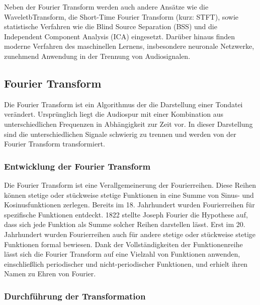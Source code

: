 \par

Neben der Fourier Transform werden auch andere Ansätze wie die WaveletbTransform, die Short-Time Fourier Transform (kurz: STFT), sowie statistische Verfahren wie die Blind Source Separation (BSS) und die Independent Component Analysis (ICA) eingesetzt. Darüber hinaus finden moderne Verfahren des maschinellen Lernens, insbesondere neuronale Netzwerke, zunehmend Anwendung in der Trennung von Audiosignalen.

%
\subsection{Fourier Transform}
%

Die Fourier Transform ist ein Algorithmus der die Darstellung einer Tondatei verändert. Ursprünglich liegt die Audiospur mit einer Kombination aus unterschiedlichen Frequenzen in Abhängigkeit zur Zeit vor. In dieser Darstellung sind die unterschiedlichen Signale schwierig zu trennen und werden von der Fourier Transform transformiert.

\par

%
\subsubsection{Entwicklung der Fourier Transform}
%

Die Fourier Transform ist eine Verallgemeinerung der Fourierreihen. Diese Reihen können stetige oder stückweise stetige Funktionen in eine Summe von Sinus- und Kosinusfunktionen zerlegen. Bereits im 18. Jahrhundert wurden Fourierreihen für spezifische Funktionen entdeckt. 1822 stellte Joseph Fourier die Hypothese auf, dass sich jede Funktion als Summe solcher Reihen darstellen lässt. Erst im 20. Jahrhundert wurden Fourierreihen auch für andere stetige oder stückweise stetige Funktionen formal bewiesen. Dank der Vollständigkeiten der Funktionenreihe lässt sich die Fourier Transform auf eine Vielzahl von Funktionen anwenden, einschließlich periodischer und nicht-periodischer Funktionen, und erhielt ihren Namen zu Ehren von Fourier.

\par

\subsubsection{Durchführung der Transformation}

